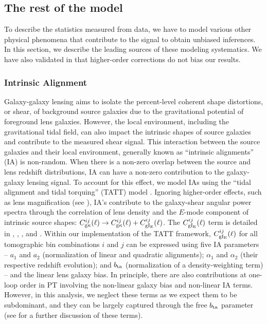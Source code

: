 \documentclass[fleqn,usenatbib]{mnras}
\newcommand{\IR}[1]{{\color{red}[\textbf{Note for IR}: #1]}}
\begin{document}
\subsection{The rest of the model}
\label{sec:model_rest}

To describe the statistics measured from data, we have to model various other physical phenomena that contribute to the signal to obtain unbiased inferences. In this section, we describe the leading sources of these modeling systematics. We have also validated in \cite{y3-generalmethods} that higher-order corrections do not bias our results. 

\subsubsection{Intrinsic Alignment} 
Galaxy-galaxy lensing aims to isolate the percent-level coherent shape distortions, or shear, of background source galaxies due to the gravitational potential of foreground lens galaxies. However, the local environment, including the gravitational tidal field, can also impact the intrinsic shapes of source galaxies and contribute to the measured shear signal. This interaction between the source galaxies and their local environment, generally known as ``intrinsic alignments'' (IA) is non-random. When there is a non-zero overlap between the source and lens redshift distributions, IA can have a non-zero contribution to the galaxy-galaxy lensing signal. To account for this effect, we model IAs using the ``tidal alignment and tidal torquing'' (TATT) model \citep{Blazek_2019}. Ignoring higher-order effects, such as lens magnification (see \citealp{y3-gglensing}), IA's contribute to the galaxy-shear angular power spectra through the correlation of lens density and the $E$-mode component of intrinsic source shapes: $C^{ij}_{\rm g\kappa}(\ell) \to C^{ij}_{\rm g\kappa}(\ell) + C^{ij}_{\rm gI_{\rm E}}(\ell)$. The $C^{ij}_{\rm gI_{\rm E}}(\ell)$ term is detailed in \cite{y3-generalmethods}, \cite{y3-cosmicshear2}, \cite{y3-gglensing}, and \citet{Blazek_2019}. Within our implementation of the TATT framework, $C^{ij}_{\rm gI_{\rm E}}(\ell)$ for all tomographic bin combinations $i$ and $j$ can be expressed using five IA parameters -- $a_1$ and $a_2$ (normalization of linear and quadratic alignments); $\alpha_1$ and $\alpha_2$ (their respective redshift evolution); and $b_{\rm ta}$ (normalization of a density-weighting term) -- and the linear lens galaxy bias. In principle, there are also contributions at one-loop order in PT involving the non-linear galaxy bias and non-linear IA terms. However, in this analysis, we neglect these terms as we expect them to be subdominant, and they can be largely captured through the free $b_{\rm ta}$ parameter (see \citealp{Blazek_2015} for a further discussion of these terms). 
\end{document}
